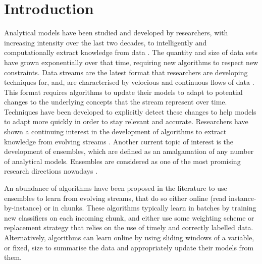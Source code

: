 
\chapter{Introduction\label{chapter:introduction}} %


\newcommand{\keyword}[1]{\textbf{#1}}
\newcommand{\tabhead}[1]{\textbf{#1}}
\newcommand{\code}[1]{\texttt{#1}}
\newcommand{\file}[1]{\texttt{\bfseries#1}}
\newcommand{\option}[1]{\texttt{\itshape#1}}

Analytical models have been studied and developed by researchers, with increasing intensity over the last two decades, to intelligently and computationally extract knowledge from data \cite{bifet2009data}. The quantity and size of data sets have grown exponentially over that time, requiring new algorithms to respect new constraints. Data streams are the latest format that researchers are developing techniques for, and, are characterised by velocious and continuous flows of data \cite{krempl2014open}. This format requires algorithms to update their models to adapt to potential changes to the underlying concepts that the stream represent over time. Techniques have been developed to explicitly detect these changes to help models to adapt more quickly in order to stay relevant and accurate. Researchers have shown a continuing interest in the development of algorithms to extract knowledge from evolving streams \cite{gama2010knowledge, gama2014survey, ghesmoune2016state, KRAWCZYK2017132, krempl2014open, silva2013data, widmer1996learning}. Another current topic of interest is the development of ensembles, which are defined as an amalgamation of any number of analytical models. Ensembles are considered as one of the most promising research directions nowadays \cite{jain2000statistical, KRAWCZYK2017132, oza2008classifier, polikar2006ensemble, rokach2009taxonomy, wozniak2014survey}.

An abundance of algorithms have been proposed in the literature to use ensembles to learn from evolving streams, that do so either online (read instance-by-instance) or in chunks. These algorithms typically learn in batches by training new classifiers on each incoming chunk, and either use some weighting scheme or replacement strategy that relies on the use of timely and correctly labelled data. Alternatively, algorithms can learn online by using sliding windows of a variable, or fixed, size to summarise the data and appropriately update their models from them.

